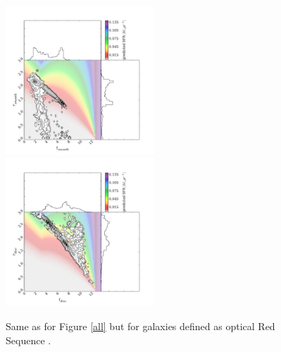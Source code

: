 \documentclass{mn2e}
\begin{document}
\begin{figure}
\includegraphics[width=0.4975\textwidth]{red_s_smooth_new.pdf}
\includegraphics[width=0.4975\textwidth]{red_s_disc_new.pdf}
\caption[8pt]{Same as for Figure \ref{all} but for galaxies defined as optical Red Sequence \cite{Baldry04}.}
\label{red_s}
\end{figure}
\end{document}
